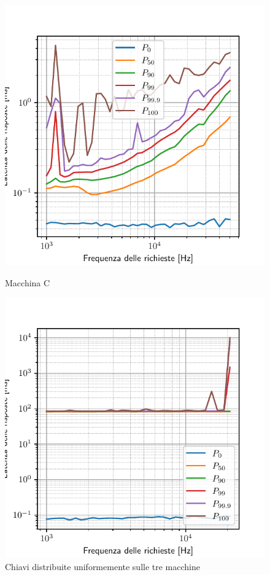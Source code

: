 \begin{figure}[htbp]
    \vspace{0.5cm}
    \begin{minipage}[t]{0.48\textwidth}
        \centering
        \includegraphics[width=\textwidth]{03-risultati/bench-get-h}
        \caption*{Macchina C}
    \end{minipage}
    \hfill
    \begin{minipage}[t]{0.48\textwidth}
        \centering
        \includegraphics[width=\textwidth]{03-risultati/bench-get-all}
        \caption*{Chiavi distribuite uniformemente sulle tre macchine}
    \end{minipage}


\end{figure}
